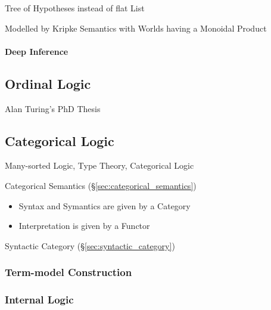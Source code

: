 Tree of Hypotheses instead of flat List

Modelled by Kripke Semantics with Worlds having a Monoidal Product



\paragraph{Deep Inference}\label{sec:deep_inference}



\subsection{Ordinal Logic}\label{sec:ordinal_logic}

Alan Turing's PhD Thesis \cite{turing38}



\subsection{Categorical Logic}\label{sec:categorical_logic}

Many-sorted Logic, Type Theory, Categorical Logic

Categorical Semantics (\S\ref{sec:categorical_semantics})

\begin{itemize}
  \item Syntax and Symantics are given by a Category
  \item Interpretation is given by a Functor
\end{itemize}

Syntactic Category (\S\ref{sec:syntactic_category})



\subsubsection{Term-model Construction}\label{sec:term_model}

\subsubsection{Internal Logic}\label{sec:internal_logic}

